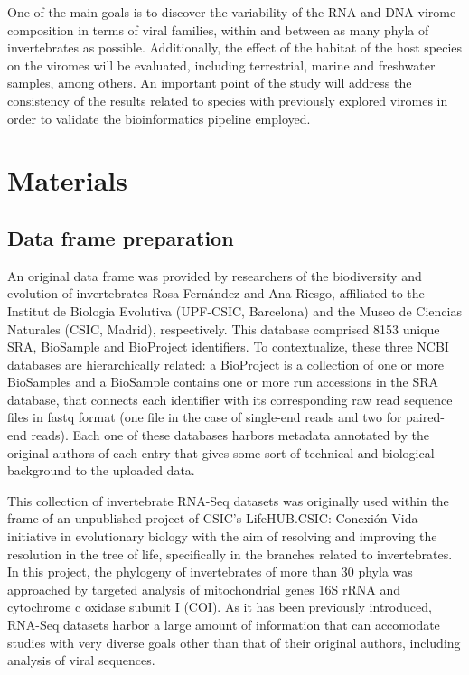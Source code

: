 \documentclass[
  openany]{book}
\begin{document}
One of the main goals is to discover the variability of the RNA and DNA virome composition in terms of viral families, within and between as many phyla of invertebrates as possible. Additionally, the effect of the habitat of the host species on the viromes will be evaluated, including terrestrial, marine and freshwater samples, among others. An important point of the study will address the consistency of the results related to species with previously explored viromes in order to validate the bioinformatics pipeline employed.

\hypertarget{materials}{%
\chapter{Materials}\label{materials}}

\hypertarget{data-frame-preparation}{%
\section{Data frame preparation}\label{data-frame-preparation}}

An original data frame was provided by researchers of the biodiversity and evolution of invertebrates Rosa Fernández and Ana Riesgo, affiliated to the Institut de Biologia Evolutiva (UPF-CSIC, Barcelona) and the Museo de Ciencias Naturales (CSIC, Madrid), respectively. This database comprised 8153 unique SRA, BioSample and BioProject identifiers. To contextualize, these three NCBI databases are hierarchically related: a BioProject is a collection of one or more BioSamples and a BioSample contains one or more run accessions in the SRA database, that connects each identifier with its corresponding raw read sequence files in fastq format (one file in the case of single-end reads and two for paired-end reads). Each one of these databases harbors metadata annotated by the original authors of each entry that gives some sort of technical and biological background to the uploaded data.

This collection of invertebrate RNA-Seq datasets was originally used within the frame of an unpublished project of CSIC's LifeHUB.CSIC: Conexión-Vida initiative in evolutionary biology with the aim of resolving and improving the resolution in the tree of life, specifically in the branches related to invertebrates. In this project, the phylogeny of invertebrates of more than 30 phyla was approached by targeted analysis of mitochondrial genes 16S rRNA and cytochrome c oxidase subunit I (COI). As it has been previously introduced, RNA-Seq datasets harbor a large amount of information that can accomodate studies with very diverse goals other than that of their original authors, including analysis of viral sequences.
\end{document}
